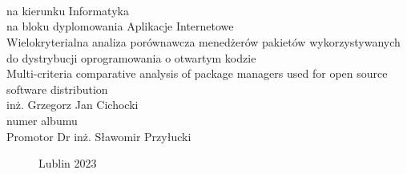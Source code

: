 \documentclass[12pt,a4paper]{article}
\def\blankpage{%
      \clearpage%
      \thispagestyle{empty}%
      \null%
      \clearpage}
\newcommand{\newCharapter}[1]{\newpage }
\begin{document}

\begin{titlepage}

    \titlepagefont
     \\
    \vspace{4cm}
    \break
    \fontsize{1.4cm}{1.4cm} \\
    \fontsize{1.4cm}{1.4cm} \\
    \vspace{0.5cm}
    \break
    \normalsize{} na kierunku Informatyka \\
    na bloku dyplomowania Aplikacje Internetowe \\
    \vspace{1cm}
    \break
    \large
    Wielokryterialna analiza porównawcza menedżerów pakietów wykorzystywanych do dystrybucji oprogramowania o otwartym kodzie \\
    \break
    Multi-criteria comparative analysis of package managers used for open source software distribution \\
    \vspace{1.5cm}
    \break
    inż. Grzegorz Jan Cichocki \\
    numer albumu   \\
    \vspace{1.5cm}
    \break
    \normalsize{}
    Promotor Dr inż. Sławomir Przyłucki
    \vspace*{\fill}
    \vspace{0.5cm}
    \begin{figure}[bbp]
        {\titlepagefont Lublin 2023}
    \end{figure}
\end{titlepage}
\newpage

\onehalfspacing
\blankpage

\newCharapter{chapters/chapter0}
\setcounter{figure}{0}
\tableofcontents
\newCharapter{chapters/chapter1}
\setcounter{figure}{0}
\newCharapter{chapters/chapter2}
\setcounter{figure}{0}
\newCharapter{chapters/chapter3}
\setcounter{figure}{0}
\newCharapter{chapters/chapter4}
\setcounter{figure}{0}
\newCharapter{chapters/chapter5}
\setcounter{figure}{0}
\newCharapter{chapters/chapter6}
\setcounter{figure}{0}
\newCharapter{chapters/chapter7}
\setcounter{figure}{0}
\newCharapter{chapters/chapter8}


\printbibliography[type=article,title={Źródła naukowe}]
\printbibliography[type=online,title={Źródła internetowe}]
\end{document}
